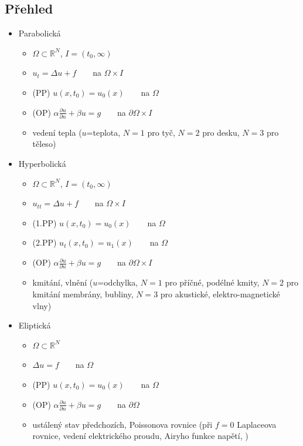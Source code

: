 \subsection{Přehled}
\begin{itemize}
    \item Parabolická
        \begin{itemize}
            \item $\Omega \subset \mathbb{R}^N$, $I=(t_0,\infty)$
            \item $u_t=\Delta u +f$\ \ \ \ na $\Omega\times I$
            \item (PP) $u(x,t_0)=u_0(x)$\ \ \ \ na $\Omega$
            \item (OP) $\alpha \frac{\partial u}{\partial n} +\beta u=g$\ \ \ \ na $\partial\Omega\times I$
            \item vedení tepla ($u$=teplota, $N=1$ pro tyč, $N=2$ pro desku, $N=3$ pro těleso)
        \end{itemize}
    \item Hyperbolická
        \begin{itemize}
            \item $\Omega \subset \mathbb{R}^N$, $I=(t_0,\infty)$
            \item $u_{tt}=\Delta u +f$\ \ \ \ na $\Omega\times I$
            \item (1.PP) $u(x,t_0)=u_0(x)$\ \ \ \ na $\Omega$
            \item (2.PP) $u_t(x,t_0)=u_1(x)$\ \ \ \ na $\Omega$
            \item (OP) $\alpha \frac{\partial u}{\partial n} +\beta u=g$\ \ \ \ na $\partial\Omega\times I$
            \item kmitání, vlnění ($u$=odchylka, $N=1$ pro příčné, podélné kmity, $N=2$ pro kmitání membrány, bubliny, $N=3$ pro akustické, elektro-magnetické vlny)
        \end{itemize}    
    \item Eliptická
        \begin{itemize}
            \item $\Omega \subset \mathbb{R}^N$
            \item $\Delta u=f$\ \ \ \ na $\Omega$
            \item (PP) $u(x,t_0)=u_0(x)$\ \ \ \ na $\Omega$
            \item (OP) $\alpha \frac{\partial u}{\partial n} +\beta u=g$\ \ \ \ na $\partial\Omega$
            \item ustálený stav předchozích, Poissonova rovnice (při $f=0$ Laplaceova rovnice, vedení elektrického proudu, Airyho funkce napětí,   )
        \end{itemize}  
\end{itemize}

